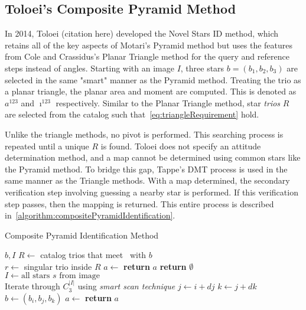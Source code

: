 \subsection{Toloei's Composite Pyramid Method}\label{subsec:toloei'sCompositePyramidMethod}
In 2014, Toloei (citation here) developed the Novel Stars ID method, which retains all of the key aspects of Motari's
Pyramid method but uses the features from Cole and Crassidus's Planar Triangle method for the query and reference steps
instead of angles.
Starting with an image $I$, three stars $b = (b_1, b_2, b_3)$ are selected in the same "smart" manner as the Pyramid
method.
Treating the trio as a planar triangle, the planar area and moment are computed.
This is denoted as $a^{123}$ and $\imath^{123}$ respectively.
Similar to the Planar Triangle method, star \textit{trios} $R$ are selected from the catalog such
that~\autoref{eq:triangleRequirement} hold.

Unlike the triangle methods, no pivot is performed.
This searching process is repeated until a unique $R$ is found.
Toloei does not specify an attitude determination method, and a map cannot be determined using common
stars like the Pyramid method.
To bridge this gap, Tappe's DMT process is used in the same manner as the Triangle methods.
With a map determined, the secondary verification step involving guessing a nearby star is performed.
If this verification step passes, then the mapping is returned.
This entire process is described in~\autoref{algorithm:compositePyramidIdentification}.

\begin{algorithm} 
    \caption{Composite Pyramid Identification Method} \label{algorithm:compositePyramidIdentification}
    \begin{algorithmic}[1]
         {$b, I$}
        \State $R \gets $ catalog trios that meet~ with $b$
        \\
        \State $r \gets $ singular trio inside $R$
        \State $a \gets $ 
        \State \textbf{return} $a$
        \EndIf
        \EndIf
        \State \textbf{return } $\emptyset$
        \EndFunction
        \\
        \State $I \gets \text{all stars } s \text{ from image}$
        \\
        \LineComment Iterate through $C^{|I|}_3$ using \textit{smart scan technique}
        \State $j \gets i + dj$
        \State $k \gets j + dk$
        \\
        \State $b \gets (b_i, b_j, b_k)$
        \State $a \gets$ 
        \State \textbf{return} $a$
        \EndIf
        \EndFor
        \EndFor
        \EndFor
        \EndProcedure
    \end{algorithmic}
\end{algorithm}

